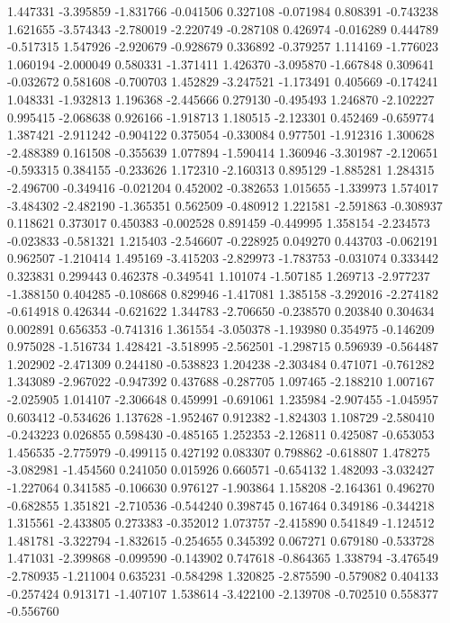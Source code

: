 1.447331
-3.395859
-1.831766
-0.041506
0.327108
-0.071984
0.808391
-0.743238
1.621655
-3.574343
-2.780019
-2.220749
-0.287108
0.426974
-0.016289
0.444789
-0.517315
1.547926
-2.920679
-0.928679
0.336892
-0.379257
1.114169
-1.776023
1.060194
-2.000049
0.580331
-1.371411
1.426370
-3.095870
-1.667848
0.309641
-0.032672
0.581608
-0.700703
1.452829
-3.247521
-1.173491
0.405669
-0.174241
1.048331
-1.932813
1.196368
-2.445666
0.279130
-0.495493
1.246870
-2.102227
0.995415
-2.068638
0.926166
-1.918713
1.180515
-2.123301
0.452469
-0.659774
1.387421
-2.911242
-0.904122
0.375054
-0.330084
0.977501
-1.912316
1.300628
-2.488389
0.161508
-0.355639
1.077894
-1.590414
1.360946
-3.301987
-2.120651
-0.593315
0.384155
-0.233626
1.172310
-2.160313
0.895129
-1.885281
1.284315
-2.496700
-0.349416
-0.021204
0.452002
-0.382653
1.015655
-1.339973
1.574017
-3.484302
-2.482190
-1.365351
0.562509
-0.480912
1.221581
-2.591863
-0.308937
0.118621
0.373017
0.450383
-0.002528
0.891459
-0.449995
1.358154
-2.234573
-0.023833
-0.581321
1.215403
-2.546607
-0.228925
0.049270
0.443703
-0.062191
0.962507
-1.210414
1.495169
-3.415203
-2.829973
-1.783753
-0.031074
0.333442
0.323831
0.299443
0.462378
-0.349541
1.101074
-1.507185
1.269713
-2.977237
-1.388150
0.404285
-0.108668
0.829946
-1.417081
1.385158
-3.292016
-2.274182
-0.614918
0.426344
-0.621622
1.344783
-2.706650
-0.238570
0.203840
0.304634
0.002891
0.656353
-0.741316
1.361554
-3.050378
-1.193980
0.354975
-0.146209
0.975028
-1.516734
1.428421
-3.518995
-2.562501
-1.298715
0.596939
-0.564487
1.202902
-2.471309
0.244180
-0.538823
1.204238
-2.303484
0.471071
-0.761282
1.343089
-2.967022
-0.947392
0.437688
-0.287705
1.097465
-2.188210
1.007167
-2.025905
1.014107
-2.306648
0.459991
-0.691061
1.235984
-2.907455
-1.045957
0.603412
-0.534626
1.137628
-1.952467
0.912382
-1.824303
1.108729
-2.580410
-0.243223
0.026855
0.598430
-0.485165
1.252353
-2.126811
0.425087
-0.653053
1.456535
-2.775979
-0.499115
0.427192
0.083307
0.798862
-0.618807
1.478275
-3.082981
-1.454560
0.241050
0.015926
0.660571
-0.654132
1.482093
-3.032427
-1.227064
0.341585
-0.106630
0.976127
-1.903864
1.158208
-2.164361
0.496270
-0.682855
1.351821
-2.710536
-0.544240
0.398745
0.167464
0.349186
-0.344218
1.315561
-2.433805
0.273383
-0.352012
1.073757
-2.415890
0.541849
-1.124512
1.481781
-3.322794
-1.832615
-0.254655
0.345392
0.067271
0.679180
-0.533728
1.471031
-2.399868
-0.099590
-0.143902
0.747618
-0.864365
1.338794
-3.476549
-2.780935
-1.211004
0.635231
-0.584298
1.320825
-2.875590
-0.579082
0.404133
-0.257424
0.913171
-1.407107
1.538614
-3.422100
-2.139708
-0.702510
0.558377
-0.556760
